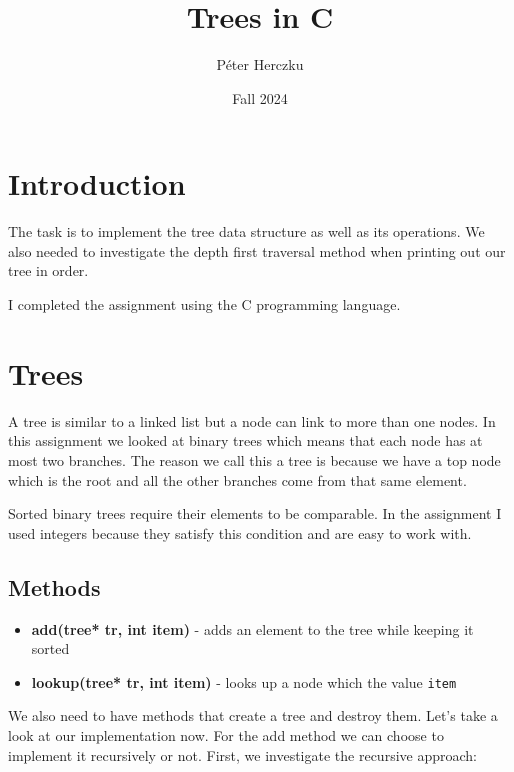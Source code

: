 \documentclass[a4paper,11pt]{article}
\begin{document}
    \title{
        \textbf{Trees in C}
    }
    \author{Péter Herczku}
    \date{Fall 2024}

    \maketitle

    \section*{Introduction}

    The task is to implement the tree data structure as well as its operations.
    We also needed to investigate the depth first traversal method when printing out our tree in order.

    I completed the assignment using the C programming language.

    \section*{Trees}

    A tree is similar to a linked list but a node can link to more than one nodes.
    In this assignment we looked at binary trees which means that each node has at most two branches.
    The reason we call this a tree is because we have a top node which is the root and all the other branches come from that same element.
    
    Sorted binary trees require their elements to be comparable. In the assignment I used integers because they satisfy this condition and are easy to work with.

    \subsection*{Methods}

    \begin{itemize}
        \item \textbf{add(tree* tr, int item)} - adds an element to the tree while keeping it sorted
        \item \textbf{lookup(tree* tr, int item)} - looks up a node which the value {\tt item}
     \end{itemize}

     We also need to have methods that create a tree and destroy them. Let's take a look at our implementation now.
     For the add method we can choose to implement it recursively or not. First, we investigate the recursive approach:
\end{document}
